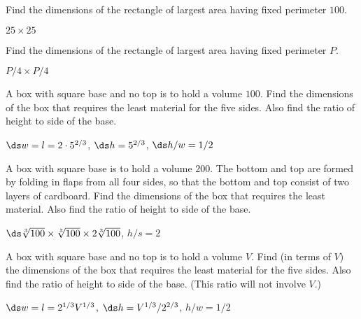\begin{enumialphparenastyle}

%

\begin{ex}
Find the dimensions of the rectangle of largest area having fixed perimeter $100$.
\begin{sol}
 $25\times 25$
\end{sol}
\end{ex}

\begin{ex}
Find the dimensions of the rectangle of largest area having fixed perimeter
$P$.
\begin{sol}
 $P/4\times P/4$
\end{sol}
\end{ex}

\begin{ex}
A box with square base and no top is to hold a volume $100$.  Find
the dimensions of the box that requires the least material for the
five sides.  Also find the ratio of height to side of the base.
\begin{sol}
 $\ds w=l=2\cdot 5^{2/3}$, $\ds h=5^{2/3}$, $\ds h/w=1/2$
\end{sol}
\end{ex}


\begin{ex}
 A box with square base is to hold a volume
$200$. The bottom and top are formed by folding in flaps from all four
sides, so that the bottom and top consist of two layers of cardboard.
Find the dimensions of the box that requires the least material.
Also find the ratio of height to side of the base.
\begin{sol}
 $\ds \root 3\of {100}\times\root 3\of {100}\times 2\root 3\of
{100}$, $h/s=2$
\end{sol}
\end{ex}

\begin{ex}
A box with square base and no top is to hold a volume $V$.  Find (in terms
of $V$) the dimensions of the box that requires the least material for the
five sides.  Also find the ratio of height to side of the base.  (This
ratio will not involve $V$.)
\begin{sol}
 $\ds w=l=2^{1/3}V^{1/3}$, $\ds h=V^{1/3}/2^{2/3}$, $h/w=1/2$
\end{sol}
\end{ex}


\end{enumialphparenastyle}
